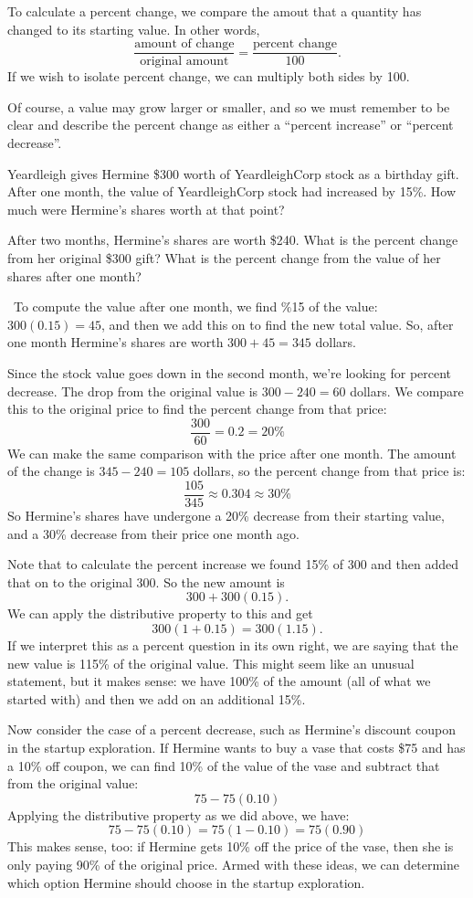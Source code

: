 To calculate a percent change, we compare the amout that a quantity has changed to its starting value. In other words, 
\[\frac{\text{amount of change}}{\text{original amount}} = \frac{\text{percent change}}{100}.\]
If we wish to isolate percent change, we can multiply both sides by 100.

Of course, a value may grow larger or smaller, and so we must remember to be clear and describe the percent change as either a ``percent increase'' or ``percent decrease''.

\begin{boxedex}
Yeardleigh gives Hermine \$300 worth of YeardleighCorp stock as a birthday gift. After one month, the value of YeardleighCorp stock had increased by 15\%. How much were Hermine's shares worth at that point?

After two months, Hermine's shares are worth \$240. What is the percent change from her original \$300 gift? What is the percent change from the value of her shares after one month?

\exsoln\ To compute the value after one month, we find \%15 of the value: $300(0.15) = 45$, and then we add this on to find the new total value. So, after one month Hermine's shares are worth $300 + 45 = 345$ dollars.

Since the stock value goes down in the second month, we're looking for percent decrease. The drop from the original value is $300-240=60$ dollars. We compare this to the original price to find the percent change from that price: \[\frac{300}{60} = 0.2 = 20\%\]
We can make the same comparison with the price after one month. The amount of the change is $345-240=105$ dollars, so the percent change from that price is: \[\frac{105}{345} \approx 0.304 \approx 30\%\]
So Hermine's shares have undergone a 20\% decrease from their starting value, and a 30\% decrease from their price one month ago.
\end{boxedex}

Note that to calculate the percent increase we found 15\% of 300 and then added that on to the original 300. So the new amount is \[300 + 300(0.15).\] We can apply the distributive property to this and get \[300(1+0.15) = 300(1.15).\] If we interpret this as a percent question in its own right, we are saying that the new value is 115\% of the original value. This might seem like an unusual statement, but it makes sense: we have 100\% of the amount (all of what we started with) and then we add on an additional 15\%.

Now consider the case of a percent decrease, such as Hermine's discount coupon in the startup exploration. If Hermine wants to buy a vase that costs \$75 and has a 10\% off coupon, we can find 10\% of the value of the vase and subtract that from the original value: \[75 - 75(0.10)\] Applying the distributive property as we did above, we have: \[75 - 75(0.10) = 75(1-0.10) = 75(0.90)\] This makes sense, too: if Hermine gets 10\% off the price of the vase, then she is only paying 90\% of the original price. Armed with these ideas, we can determine which option Hermine should choose in the startup exploration.

